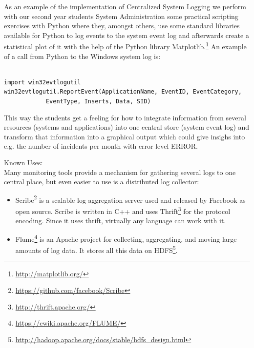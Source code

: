 \begin{center}
   
\end{center}

As an example of the implementation of {\sc Centralized System Logging} we perform with our second year students System Administration some practical scripting exercises with Python where they, amongst others, use some standard libraries available for Python to log events to the system event log and afterwards create a statistical plot of it with the help of the Python library Matplotlib.\footnote{\url{http://matplotlib.org/}} 
An example of a call from Python to the Windows system log is:

               
\lstset{language=Python}

\begin{lstlisting}

import win32evtlogutil
win32evtlogutil.ReportEvent(ApplicationName, EventID, EventCategory,
    		EventType, Inserts, Data, SID)

\end{lstlisting}


This way the students get a feeling for how to integrate information from several resources (systems and applications) into one central store (system event log) and transform that information into a graphical output which could give insighs into e.g. the number of incidents per month with error level ERROR.

Known Uses:\\
Many monitoring tools provide a mechanism for gathering several logs to one central place, but even easier to use is a distributed log collector:
\begin{itemize}
	\item Scribe\footnote{\url{https://github.com/facebook/Scribe}} is a scalable log aggregation server used and released by Facebook as open source. Scribe is written in C++ and uses Thrift\footnote{\url{http://thrift.apache.org/}} for the protocol encoding. Since it uses thrift, virtually any language can work with it.
	\item Flume\footnote{\url{https://cwiki.apache.org/FLUME/}} is an Apache project for collecting, aggregating, and moving large amounts of log data. It stores all this data on HDFS\footnote{\url{http://hadoop.apache.org/docs/stable/hdfs_design.html}}.
\end{itemize}




